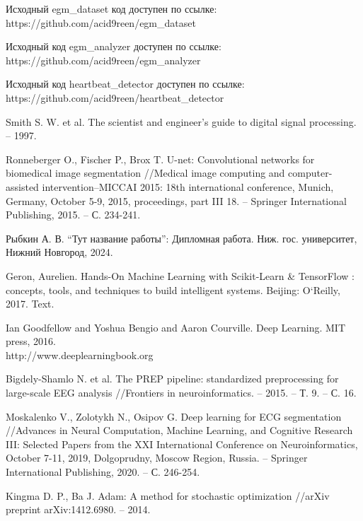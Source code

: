 \begingroup
\begin{thebibliography}{00}
	Исходный egm\_dataset код доступен по ссылке: https://github.com/acid9reen/egm\_dataset

	Исходный код egm\_analyzer доступен по ссылке: https://github.com/acid9reen/egm\_analyzer

	Исходный код heartbeat\_detector доступен по ссылке:\\
	https://github.com/acid9reen/heartbeat\_detector

	Smith S. W. et al. The scientist and engineer's guide to digital signal processing. -- 1997.

	Ronneberger O., Fischer P., Brox T. U-net: Convolutional networks for
	biomedical image segmentation //Medical image computing and
	computer-assisted intervention–MICCAI 2015: 18th international conference,
	Munich, Germany, October 5-9, 2015, proceedings, part III 18. – Springer
	International Publishing, 2015. – С. 234-241.

	Рыбкин А. В. ``Тут название работы'': Дипломная работа. Ниж. гос. университет, Нижний Новгород, 2024.

	Geron, Aurelien. Hands-On Machine Learning with Scikit-Learn \& TensorFlow
	: concepts, tools, and techniques to build intelligent systems. Beijing:
	O`Reilly, 2017. Text.

	Ian Goodfellow and Yoshua Bengio and Aaron Courville. Deep Learning. MIT
	press, 2016.\\ http://www.deeplearningbook.org

	Bigdely-Shamlo N. et al. The PREP pipeline: standardized preprocessing for
	large-scale EEG analysis //Frontiers in neuroinformatics. – 2015. – Т. 9. –
	С. 16.

	Moskalenko V., Zolotykh N., Osipov G. Deep learning for ECG segmentation
	//Advances in Neural Computation, Machine Learning, and Cognitive Research
	III: Selected Papers from the XXI International Conference on
	Neuroinformatics, October 7-11, 2019, Dolgoprudny, Moscow Region, Russia. –
	Springer International Publishing, 2020. – С. 246-254.

	Kingma D. P., Ba J. Adam: A method for stochastic optimization //arXiv
	preprint arXiv:1412.6980. – 2014.


\end{thebibliography}
